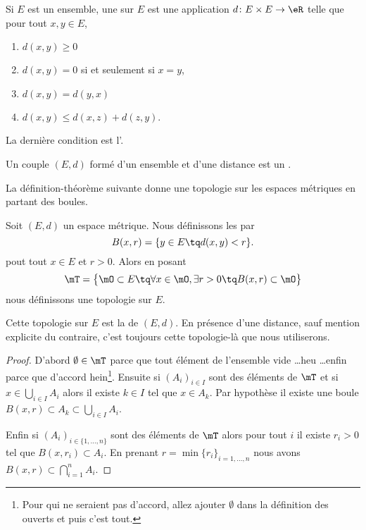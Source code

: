 \begin{definition}  \label{DefMVNVFsX}
    Si $E$ est un ensemble, une  sur $E$ est une application $d\colon E\times E\to \eR$ telle que pour tout $x,y\in E$,
    \begin{enumerate}

    \item
    $d(x,y)\geq 0$

    \item
    $d(x,y)=0$ si et seulement si $x=y$,

    \item
    $d(x,y)=d(y,x)$

    \item
    $d(x,y)\leq d(x,z)+d(z,y)$.

    \end{enumerate}
    La dernière condition est l'.

    Un couple $(E,d)$ formé d'un ensemble et d'une distance est un .
\end{definition}

La définition-théorème suivante donne une topologie sur les espaces métriques en partant des boules.

\begin{theoremDef}     \label{ThoORdLYUu}
    Soit \( (E,d)\) un espace métrique. Nous définissons les  par
    \begin{equation}        \label{EQooYCWSooIhibvd}
        B(x,r)=\{ y\in E\tq d(x,y)<r \}.
    \end{equation}
    pout tout \( x\in E\) et \( r>0\).
    Alors en posant
    \begin{equation}        \label{EqGDVVooDZfwSf}
        \mT=\big\{  \mO\subset E  \tq\forall x\in \mO,\exists r>0\tq B(x,r)\subset \mO \big\}
    \end{equation}
    nous définissons une topologie sur \( E\).

    Cette topologie sur \( E\) est la  de \( (E,d)\). En présence d'une distance, sauf mention explicite du contraire, c'est toujours cette topologie-là que nous utiliserons.
\end{theoremDef}

\begin{proof}
    D'abord \( \emptyset\in\mT\) parce que tout élément de l'ensemble vide \ldots heu \ldots enfin parce que d'accord hein\footnote{Pour qui ne seraient pas d'accord, allez ajouter \( \emptyset\) dans la définition des ouverts et puis c'est tout.}. Ensuite si \( (A_i)_{i\in I}\) sont des éléments de \( \mT\) et si \( x\in\bigcup_{i\in I}A_i\) alors il existe \( k\in I\) tel que \( x\in A_k\). Par hypothèse il existe une boule \( B(x,r)\subset A_k\subset\bigcup_{i\in I}A_i\).

    Enfin si \( (A_i)_{i\in\{ 1,\ldots, n \}}\) sont des éléments de \( \mT\) alors pour tout \( i\) il existe \( r_i>0\) tel que \( B(x,r_i)\subset A_i\). En prenant \( r=\min\{ r_i \}_{i=1,\ldots, n}\) nous avons $B(x,r)\subset\bigcap_{i=1}^nA_i.$
\end{proof}

